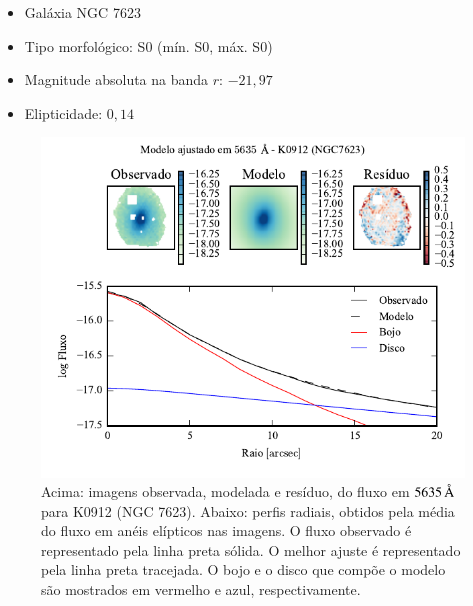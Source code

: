 \begin{itemize}
  \item Galáxia NGC 7623
  \item Tipo morfológico: S0 (mín. S0, máx. S0)
  \item Magnitude absoluta na banda $r$: $-21,97$
  \item Elipticidade: $0,14$
\end{itemize}

\begin{figure}
	\includegraphics[page=1]{figuras-decomp/K0912_sample006a}
	\caption[Ajuste morfológico em $5635\,\angstrom$ de K0912 (NGC 7623)]
	{Acima: imagens observada, modelada e resíduo, do fluxo em $5635\,\angstrom$
	para K0912 (NGC 7623). Abaixo: perfis radiais, obtidos pela média do fluxo em
	anéis elípticos nas imagens. O fluxo observado é representado pela linha preta
	sólida. O melhor ajuste é representado pela linha preta tracejada. O bojo e o
	disco que compõe o modelo são mostrados em vermelho e azul, respectivamente.}
	\label{fig:decompRadprof:K0912}
\end{figure}

